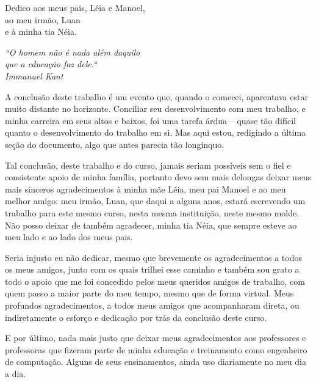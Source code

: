 \documentclass[
	11pt,
	openright,
	oneside,
	a4paper,
	english,
	french,
	spanish,
	brazil,	
	]{abntex2}
\newcommand{\quot}[1]{\begin{flushright} \textit{#1}\end{flushright}}
\begin{document}
\frenchspacing 

 \pretextual

\imprimircapa

\imprimirfolhaderosto*



\begin{dedicatoria}
    \vspace*{\fill}
	\begin{flushright}
		Dedico aos meus pais, Léia e Manoel,\\ ao meu irmão, Luan \\ e à minha tia Néia.	
	\end{flushright}
\end{dedicatoria}

\begin{agradecimentos}

\quot{``O homem não é nada além daquilo\\que a educação faz dele.``\\Immanuel Kant}

A conclusão deste trabalho é um evento que, quando o comecei, aparentava estar muito distante no horizonte. Conciliar seu desenvolvimento com meu trabalho, e minha carreira em seus altos e baixos, foi uma tarefa árdua -- quase tão difícil quanto o desenvolvimento do trabalho em si. Mas aqui estou, redigindo a última seção do documento, algo que antes parecia tão longínquo.

Tal conclusão, deste trabalho e do curso, jamais seriam possíveis sem o fiel e consistente apoio de minha família, portanto devo sem mais delongas deixar meus mais sinceros agradecimentos à minha mãe Léia, meu pai Manoel e ao meu melhor amigo: meu irmão, Luan, que daqui a alguns anos, estará escrevendo um trabalho para este mesmo curso, nesta mesma instituição, neste mesmo molde. Não posso deixar de também agradecer, minha tia Néia, que sempre esteve ao meu lado e ao lado dos meus pais.

Seria injusto eu não dedicar, mesmo que brevemente os agradecimentos a todos os meus amigos, junto com os quais trilhei esse caminho e também sou grato a todo o apoio que me foi concedido pelos meus queridos amigos de trabalho, com quem passo a maior parte do meu tempo, mesmo que de forma virtual. Meus profundos agradecimentos, a todos meus amigos que acompanharam direta, ou indiretamente o esforço e dedicação por trás da conclusão deste curso.

E por último, nada mais justo que deixar meus agradecimentos aos professores e professoras que fizeram parte de minha educação e treinamento como engenheiro de computação. Alguns de seus ensinamentos, ainda uso diariamente no meu dia a dia.

\end{agradecimentos}
\end{document}
